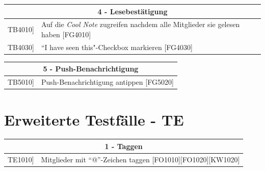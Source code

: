 \documentclass[a4paper]{scrreprt}
\begin{document}
	    \vspace{5mm}
	    
	    \begin{table}[h!]
	    	\centering
	    	\label{my-label}
	    	\begin{tabular}{p{2cm}p{12cm}}
	    		
	    		\multicolumn{2}{c}{\textbf{4 - Lesebestätigung}} \\ \hline
	    		\centering{[}TB4010{]} & Auf die \textit{Cool Note} zugreifen nachdem alle Mitglieder sie  gelesen haben {[}FG4010{]}\\
	    		\centering{[}TB4030{]}& ``I have seen this"-Checkbox markieren {[}FG4030{]}\\ 
	    		
	    		\hline
	    	\end{tabular}
	    \end{table}
	    
	    \vspace{5mm}
	    
	    \begin{table}[h!]
	    	\centering
	    	\label{my-label}
	    	\begin{tabular}{p{2cm}p{12cm}}
	    		
	    		\multicolumn{2}{c}{\textbf{5 - Push-Benachrichtigung}} \\ \hline
	    		\centering{[}TB5010{]} & Push-Benachrichtigung antippen {[}FG5020{]}\\
	    		
	    		
	    		\hline
	    	\end{tabular}
	    \end{table}
	    
	    \clearpage
	    
	    \section{Erweiterte Testfälle - TE}
	    
	    \begin{table}[h]
	    	\centering
	    	\label{my-label}
	    	\begin{tabular}{p{2cm}p{12cm}}
	    		
	    		\multicolumn{2}{c}{\textbf{1 - Taggen}} \\ \hline
	    		\centering{[}TE1010{]} & Mitglieder mit ``@”-Zeichen taggen {[}FO1010{]}{[}FO1020{]}{[}KW1020{]}\\
	    		\hline
	    	\end{tabular}
	    \end{table}
	    
\end{document}
